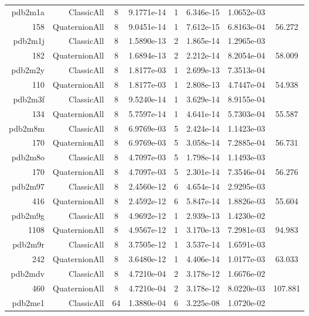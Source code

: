 \begin{xltabular}{\textwidth}{r|rcS[table-format=1.4e+2]cS[table-format=1.3e+2]S[table-format=1.4e+2]S[table-format=-1.3]}
pdb2m1a & ClassicAll & 8 & 9.1771e-14 & 1 & 6.346e-15 & 1.0652e-03 & \\
158 & QuaternionAll & 8 & 9.0451e-14 & 1 & 7.612e-15 & 6.8163e-04 & 56.272\\  \addlinespace
pdb2m1j & ClassicAll & 8 & 1.5890e-13 & 2 & 1.865e-14 & 1.2965e-03 & \\
182 & QuaternionAll & 8 & 1.6894e-13 & 2 & 2.212e-14 & 8.2054e-04 & 58.009\\  \addlinespace
pdb2m2y & ClassicAll & 8 & 1.8177e-03 & 1 & 2.699e-13 & 7.3513e-04 & \\
110 & QuaternionAll & 8 & 1.8177e-03 & 1 & 2.808e-13 & 4.7447e-04 & 54.938\\  \addlinespace
pdb2m3f & ClassicAll & 8 & 9.5240e-14 & 1 & 3.629e-14 & 8.9155e-04 & \\
134 & QuaternionAll & 8 & 5.7597e-14 & 1 & 4.641e-14 & 5.7303e-04 & 55.587\\  \addlinespace
pdb2m8m & ClassicAll & 8 & 6.9769e-03 & 5 & 2.424e-14 & 1.1423e-03 & \\
170 & QuaternionAll & 8 & 6.9769e-03 & 5 & 3.058e-14 & 7.2885e-04 & 56.731\\  \addlinespace
pdb2m8o & ClassicAll & 8 & 4.7097e-03 & 5 & 1.798e-14 & 1.1493e-03 & \\
170 & QuaternionAll & 8 & 4.7097e-03 & 5 & 2.301e-14 & 7.3546e-04 & 56.276\\  \addlinespace
pdb2m97 & ClassicAll & 8 & 2.4560e-12 & 6 & 4.654e-14 & 2.9295e-03 & \\
416 & QuaternionAll & 8 & 2.4592e-12 & 6 & 5.847e-14 & 1.8826e-03 & 55.604\\  \addlinespace
pdb2m9g & ClassicAll & 8 & 4.9692e-12 & 1 & 2.939e-13 & 1.4230e-02 & \\
1108 & QuaternionAll & 8 & 4.9567e-12 & 1 & 3.170e-13 & 7.2981e-03 & 94.983\\  \addlinespace
pdb2m9r & ClassicAll & 8 & 3.7505e-12 & 1 & 3.537e-14 & 1.6591e-03 & \\
242 & QuaternionAll & 8 & 3.6480e-12 & 1 & 4.406e-14 & 1.0177e-03 & 63.033\\  \addlinespace
pdb2mdv & ClassicAll & 8 & 4.7210e-04 & 2 & 3.178e-12 & 1.6676e-02 & \\
460 & QuaternionAll & 8 & 4.7210e-04 & 2 & 3.178e-12 & 8.0220e-03 & 107.881\\  \addlinespace
pdb2me1 & ClassicAll & 64 & 1.3880e-04 & 6 & 3.225e-08 & 1.0720e-02 & \\

\end{xltabular}
